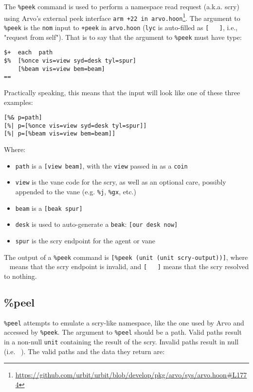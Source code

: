 \documentclass[twoside]{article}
\begin{document}
The \texttt{\%peek} command is used to perform a namespace read request (a.k.a. scry) using Arvo's external peek interface \texttt{arm +22 in arvo.hoon}\footnote{\url{https://github.com/urbit/urbit/blob/develop/pkg/arvo/sys/arvo.hoon#L1774}}. The argument to \texttt{\%peek} is the \texttt{nom} input to \texttt{+peek} in \texttt{arvo.hoon} (\texttt{lyc} is auto-filled as \texttt{[~ ~]}, i.e., "request from self"). That is to say that the argument to \texttt{\%peek} must have type:
\begin{verbatim}
$+  each  path
$%  [%once vis=view syd=desk tyl=spur]
    [%beam vis=view bem=beam]
==
\end{verbatim}
Practically speaking, this means that the input will look like one of these three examples:
\begin{verbatim}
[%& p=path]
[%| p=[%once vis=view syd=desk tyl=spur]]
[%| p=[%beam vis=view bem=beam]]
\end{verbatim}
Where:
\begin{itemize}
  \item \texttt{path} is a \texttt{[view beam]}, with the \texttt{view} passed in as a \texttt{coin}
  \item \texttt{view} is the vane code for the scry, as well as an optional care, possibly appended to the vane (e.g. \texttt{\%j}, \texttt{\%gx}, etc.)
  \item \texttt{beam} is a \texttt{[beak spur]}
  \item \texttt{desk} is used to auto-generate a \texttt{beak}: \texttt{[our desk now]}
  \item \texttt{spur} is the scry endpoint for the agent or vane
\end{itemize}

The output of a \texttt{\%peek} command is \texttt{[\%peek (unit (unit scry-output))]}, where \texttt{~} means that the scry endpoint is invalid, and \texttt{[~ ~]} means that the scry resolved to nothing.

\subsection{\%peel}

\texttt{\%peel} attempts to emulate a scry-like namespace, like the one used by Arvo and accessed by \texttt{\%peek}. The argument to \texttt{\%peel} should be a path. Valid paths result in a non-null \texttt{unit} containing the result of the scry. Invalid paths result in null (i.e. \texttt{~}). The valid paths and the data they return are:
\end{document}
